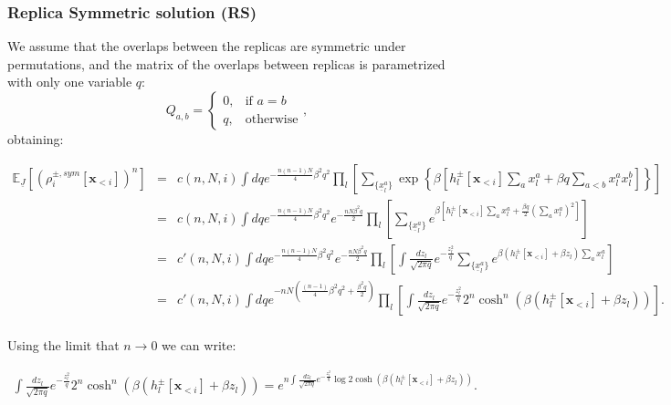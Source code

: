\subsubsection{Replica Symmetric solution (RS)}
We assume that the overlaps between the replicas are symmetric under permutations, and the matrix of the overlaps between replicas is parametrized with only one variable $q$:
$$
Q_{a,b}=\begin{cases}
			0, & \text{if $a=b$}\\
            q, & \text{otherwise}
		 \end{cases},
$$
obtaining:
\begin{widetext}
\begin{eqnarray}
\mathbb{E}_{\underline{J}}\left[(\rho_i^{\pm, sym}[\mathbf{x}_{<i}])^n \right] & = & 
c(n,N,i)
\int dq e^{-\frac{n(n-1)N}{4}\beta^2 q^2}
\prod_{l} \left[
\sum_{\{\underline{x}^{a}_l\}} 
\exp\left\{\beta \left[
h_l^{\pm}[\mathbf{x}_{<i}] \sum_{a} x_l^{a} +\beta q \sum_{a<b} x_l^{a} x_l^{b} \right]  \right\} 
\right] \\
& = &
c(n,N,i)
\int dq e^{-\frac{n(n-1)N}{4}\beta^2 q^2}
e^{-\frac{nN\beta^2 q}{2}}
\prod_{l} \left[
\sum_{\{\underline{x}^{a}_l\}} 
e^{\beta \left[
h_l^{\pm}[\mathbf{x}_{<i}] \sum_{a} x_l^{a} + \frac{\beta q}{2} \left(\sum_{a} x_l^{a} \right)^2 \right]} 
\right]\\
& = &
c'(n,N,i)
\int dq e^{-\frac{n(n-1)N}{4}\beta^2 q^2}
e^{-\frac{nN\beta^2 q}{2}}
\prod_{l} \left[\int \frac{dz_l}{\sqrt{2\pi q}} e^{-\frac{z_l^2}{q}}
\sum_{\{\underline{x}^{a}_l\}} 
e^{\beta \left(
h_l^{\pm}[\mathbf{x}_{<i}] +\beta z_l \right) \sum_{a} x_l^{a}} 
\right]\\
& = &
c'(n,N,i)
\int dq e^{-nN\left(\frac{(n-1)}{4}\beta^2 q^2 +\frac{\beta^2 q}{2}\right)}
\prod_{l} \left[\int \frac{dz_l}{\sqrt{2\pi q}} e^{-\frac{z_l^2}{q}}
2^n\cosh^n \left(\beta \left(
h_l^{\pm}[\mathbf{x}_{<i}] +\beta z_l \right)\right) 
\right].\\
\end{eqnarray}
\end{widetext}
Using the limit that $n\rightarrow 0$ we can write:
\begin{widetext}
\begin{eqnarray}
\int \frac{dz_l}{\sqrt{2\pi q}} e^{-\frac{z_l^2}{q}}
2^n\cosh^n \left(\beta \left(
h_l^{\pm}[\mathbf{x}_{<i}] +\beta z_l \right)\right) = e^{n \int \frac{dz_l}{\sqrt{2\pi q}} e^{-\frac{z_l^2}{q}}
\log 2\cosh \left(\beta \left(
h_l^{\pm}[\mathbf{x}_{<i}] +\beta z_l \right)\right)}.
\label{eq:gauss_n0}
\end{eqnarray}
\end{widetext}
